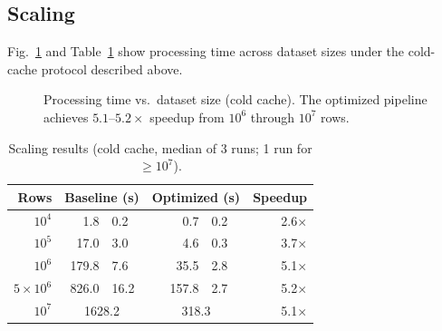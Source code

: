 \documentclass[journal]{IEEEtran}
\begin{document}
\subsection{Scaling}
\label{sec:scaling}

Fig.~\ref{fig:scaling} and Table~\ref{tab:scaling} show processing time across dataset sizes under the cold-cache protocol described above.

\begin{figure}[!ht]
\centering
{}
\caption{Processing time vs.\ dataset size (cold cache). The optimized pipeline achieves $5.1\text{--}5.2\times$ speedup from $10^6$ through $10^7$ rows.}
\label{fig:scaling}
\end{figure}

\begin{table}[!ht]
\centering
\caption{Scaling results (cold cache, median of 3 runs; 1 run for $\geq 10^7$).}
\label{tab:scaling}
\begin{tabular}{rr@{\,$\pm$\,}lr@{\,$\pm$\,}lr}
\toprule
\textbf{Rows} & \multicolumn{2}{c}{\textbf{Baseline (s)}} & \multicolumn{2}{c}{\textbf{Optimized (s)}} & \textbf{Speedup} \\
\midrule
$10^4$          & 1.8   & 0.2  & 0.7   & 0.2  & 2.6$\times$ \\
$10^5$          & 17.0  & 3.0  & 4.6   & 0.3  & 3.7$\times$ \\
$10^6$          & 179.8 & 7.6  & 35.5  & 2.8  & 5.1$\times$ \\
$5 \times 10^6$ & 826.0 & 16.2 & 157.8 & 2.7  & 5.2$\times$ \\
$10^7$          & \multicolumn{2}{c}{1628.2} & \multicolumn{2}{c}{318.3} & 5.1$\times$ \\
\bottomrule
\end{tabular}
\end{table}
\end{document}
